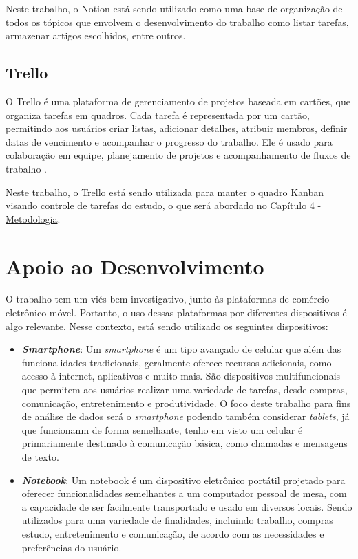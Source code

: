 Neste trabalho, o Notion está sendo utilizado como uma base de organização de todos os tópicos que envolvem o desenvolvimento do trabalho como listar tarefas, armazenar artigos escolhidos, entre outros.

\subsection{Trello}
    \label{Trello}

O Trello é uma plataforma de gerenciamento de projetos baseada em cartões, que organiza tarefas em quadros. Cada tarefa é representada por um cartão, permitindo aos usuários criar listas, adicionar detalhes, atribuir membros, definir datas de vencimento e acompanhar o progresso do trabalho. Ele é usado para colaboração em equipe, planejamento de projetos e acompanhamento de fluxos de trabalho \cite{Trello}.

Neste trabalho, o Trello está sendo utilizada para manter o quadro Kanban visando controle de tarefas do estudo, o que será abordado no \hyperref[chap:Metodologia]{Capítulo 4 - Metodologia}.


\section{Apoio ao Desenvolvimento} 
    \label{desenvolvimento}

O trabalho tem um viés bem investigativo, junto às plataformas de comércio eletrônico móvel. Portanto, o uso dessas plataformas por diferentes dispositivos é algo relevante. Nesse contexto, está sendo utilizado os seguintes dispositivos:

\begin{itemize}
    \item \textbf{\textit{Smartphone}}: Um \textit{smartphone} é um tipo avançado de celular que além das funcionalidades tradicionais, geralmente oferece recursos adicionais, como acesso à internet, aplicativos e muito mais. São dispositivos multifuncionais que permitem aos usuários realizar uma variedade de tarefas, desde compras, comunicação, entretenimento e produtividade. O foco deste trabalho para fins de análise de dados será o \textit{smartphone} podendo também considerar \textit{tablets}, já que funcionanm de forma semelhante, tenho em visto um celular é primariamente destinado à comunicação básica, como chamadas e mensagens de texto.

    \item \textbf{\textit{Notebook}}: Um notebook é um dispositivo eletrônico portátil projetado para oferecer funcionalidades semelhantes a um computador pessoal de mesa, com a capacidade de ser facilmente transportado e usado em diversos locais. Sendo utilizados para uma variedade de finalidades, incluindo trabalho, compras estudo, entretenimento e comunicação, de acordo com as necessidades e preferências do usuário.
\end{itemize}

